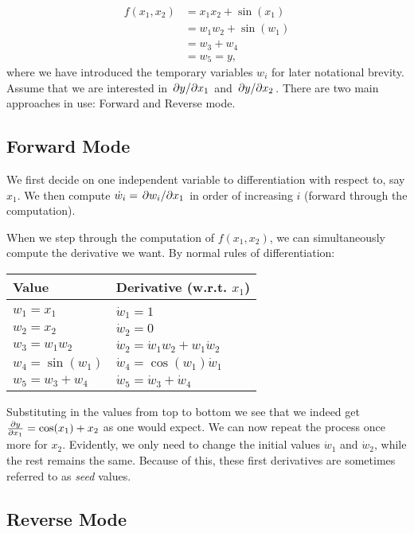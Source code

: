 \documentclass[Thesis.tex]{subfiles}
\begin{document}
\begin{align}
  f(x_1, x_2) &= x_1x_2 + \sin(x_1)\\
              &= w_1w_2 + \sin(w_1)\\
              &= w_3 + w_4\\
              &= w_5 = y,
\end{align}
where we have introduced the temporary variables $w_i$ for later notational brevity.
Assume that we are interested in $\pdv*{y}{x_1}$ and $\pdv*{y}{x_2}$. There are
two main approaches in use: Forward and Reverse mode.

\subsection{Forward Mode}

We first decide on one independent variable to differentiation with respect to,
say $x_1$. We then compute $\dot w_i = \pdv*{w_i}{x_1}$ in order of increasing
$i$ (forward through the computation).

When we step through the computation of $f(x_1, x_2)$, we can simultaneously
compute the derivative we want. By normal rules of differentiation:

\begin{center}
  \begin{tabular}{ll}
    Value & Derivative (w.r.t. $x_1$)\\\hline\\
    $w_1 = x_1$ & $\dot w_1 = 1$\\
    $w_2 = x_2$ & $\dot w_2 = 0$\\
    $w_3 = w_1w_2$ & $\dot w_2 = \dot w_1 w_2 + w_1\dot w_2$\\
    $w_4 = \sin(w_1)$ & $\dot w_4 = \cos(w_1)\dot w_1$\\
    $w_5 = w_3 + w_4$ & $\dot w_5 = \dot w_3 +\dot w_4$\\
  \end{tabular}
\end{center}
Substituting in the values from top to bottom we see that we indeed get
$\pdv{y}{x_1}=\cos(x_1)+x_2$ as one would expect. We can now repeat the process
once more for $x_2$. Evidently, we only need to change the initial values $\dot
w_1$ and $\dot w_2$, while the rest remains the same. Because of this, these
 first derivatives are sometimes referred to as \emph{seed} values.

\subsection{Reverse Mode}
\end{document}
